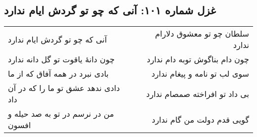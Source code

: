 \begin{center}
\section*{غزل شماره ۱۰۱: آنی که چو تو گردش ایام ندارد}
\label{sec:101}
\begin{longtable}{l p{0.5cm} r}
آنی که چو تو گردش ایام ندارد
&&
سلطان چو تو معشوق دلارام ندارد
\\
چون دانهٔ یاقوت تو گل دانه ندارد
&&
چون دام بناگوش توبه دام ندارد
\\
بادی نبرد در همه آفاق که از ما
&&
سوی لب تو نامه و پیغام ندارد
\\
دادی ندهد عشق تو ما را که در آن داد
&&
بی داد تو افراخته صمصام ندارد
\\
من در نرسم در تو به صد حیله و افسون
&&
گویی قدم دولت من گام ندارد
\\
\end{longtable}
\end{center}
